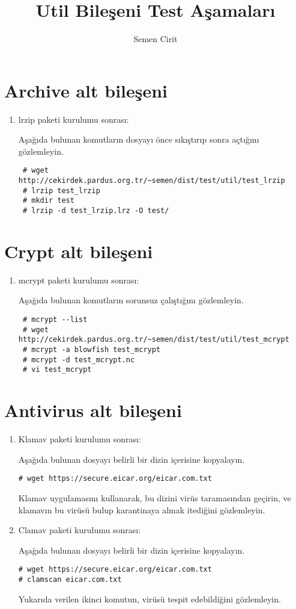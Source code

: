 \documentclass[a4paper,10pt]{article}
\title{Util Bileşeni Test Aşamaları}
\author{Semen Cirit}
\begin{document}
\maketitle
\section{Archive alt bileşeni}
\begin{enumerate}
 \item lrzip paketi kurulumu sonrası:

Aşağıda bulunan komutların dosyayı önce sıkıştırıp sonra açtığını gözlemleyin.
\begin{verbatim}
 # wget http://cekirdek.pardus.org.tr/~semen/dist/test/util/test_lrzip
 # lrzip test_lrzip
 # mkdir test
 # lrzip -d test_lrzip.lrz -O test/
\end{verbatim}


\end{enumerate}


\section{Crypt alt bileşeni}
\begin{enumerate}
 \item mcrypt paketi kurulumu sonrası:

Aşağıda bulunan komutların sorunsuz çalıştığını gözlemleyin.
\begin{verbatim}
 # mcrypt --list
 # wget http://cekirdek.pardus.org.tr/~semen/dist/test/util/test_mcrypt
 # mcrypt -a blowfish test_mcrypt
 # mcrypt -d test_mcrypt.nc
 # vi test_mcrypt
\end{verbatim}


\end{enumerate}


\section{Antivirus alt bileşeni}
\begin{enumerate}
\item Klamav paketi kurulumu sonrası:

Aşağıda bulunan dosyayı belirli bir dizin içerisine kopyalayın. 
\begin{verbatim}
# wget https://secure.eicar.org/eicar.com.txt
\end{verbatim}

Klamav uygulamasını kullanarak, bu dizini virüs taramasından geçirin, ve klamavın bu virüsü bulup karantinaya almak itediğini gözlemleyin.

\item Clamav paketi kurulumu sonrası:

Aşağıda bulunan dosyayı belirli bir dizin içerisine kopyalayın. 
\begin{verbatim}
# wget https://secure.eicar.org/eicar.com.txt
# clamscan eicar.com.txt
\end{verbatim}

Yukarıda verilen ikinci komutun, virüsü tespit edebildiğini gözlemleyin.

\end{enumerate}
\end{document}
